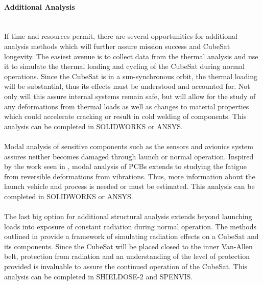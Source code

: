\paragraph{Additional Analysis} ~\\

If time and resources permit, there are several opportunities for additional analysis methods which will further assure mission success and CubeSat longevity. The easiest avenue is to collect data from the thermal analysis and use it to simulate the thermal loading and cycling of the CubeSat during normal operations. Since the CubeSat is in a sun-synchronous orbit, the thermal loading will be substantial, thus its effects must be understood and accounted for. Not only will this assure internal systems remain safe, but will allow for the study of any deformations from thermal loads as well as changes to material properties which could accelerate cracking or result in cold welding of components. This analysis can be completed in SOLIDWORKS or ANSYS.
~\\~\\
Modal analysis of sensitive components such as the sensors and avionics system assures neither becomes damaged through launch or normal operation. Inspired by the work seen in \cite{FEA7}, modal analysis of PCBs extends to studying the fatigue from reversible deformations from vibrations. Thus, more information about the launch vehicle and process is needed or must be estimated. This analysis can be completed in SOLIDWORKS or ANSYS.
~\\~\\
The last big option for additional structural analysis extends beyond launching loads into exposure of constant radiation during normal operation. The methods outlined in \cite{SCRP} provide a framework of simulating radiation effects on a CubeSat and its components. Since the CubeSat will be placed closed to the inner Van-Allen belt, protection from radiation and an understanding of the level of protection provided is invaluable to assure the continued operation of the CubeSat. This analysis can be completed in SHIELDOSE-2 and SPENVIS.
